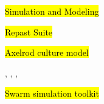 
\hl{Simulation and Modeling}

\hl{Repast Suite}

\cite{repast}

\hl{Axelrod culture model}

\cite{zuckbook}, \cite{axelrod0}, \cite{axelrod1}, \cite{axelrod2}

\hl{Swarm simulation toolkit}

\cite{swarm}
